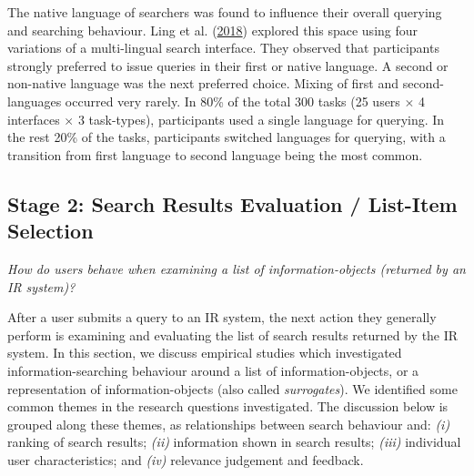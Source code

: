 \documentclass[letterpaper, nobind]{templates/ociamthesis}
\begin{document}
The native language of searchers was found to influence their overall
querying and searching behaviour. Ling et al. (\protect\hyperlink{ref-132}{2018}) explored this space using four
variations of a multi-lingual search interface. They observed that
participants strongly preferred to issue queries in their first or
native language. A second or non-native language was the next preferred
choice. Mixing of first and second-languages occurred very rarely. In
80\% of the total 300 tasks (25 users \(\times\) 4 interfaces \(\times\) 3
task-types), participants used a single language for querying. In the
rest 20\% of the tasks, participants switched languages for querying,
with a transition from first language to second language being the most
common.

\hypertarget{sec-bg-search-list}{%
\subsection{Stage 2: Search Results Evaluation / List-Item Selection}\label{sec-bg-search-list}}

\emph{How do users behave when examining a list of information-objects
(returned by an IR system)?}

After a user submits a query to an IR system, the next action they
generally perform is examining and evaluating the list of search results
returned by the IR system. In this section, we discuss empirical studies
which investigated information-searching behaviour around a list of
information-objects, or a representation of information-objects (also
called \emph{surrogates}). We identified some common themes in the research
questions investigated. The discussion below is grouped along these
themes, as relationships between search behaviour and: \emph{(i)} ranking of
search results; \emph{(ii)} information shown in search results; \emph{(iii)}
individual user characteristics; and \emph{(iv)} relevance judgement and
feedback.
\end{document}
